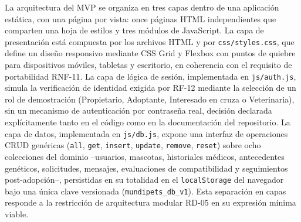 \documentclass[journal,onecolumn]{IEEEtran}
\begin{document}
	La arquitectura del MVP se organiza en tres capas dentro de una aplicación
	estática, con una página por vista: once páginas HTML independientes que
	comparten una hoja de estilos y tres módulos de JavaScript. La capa de
	presentación está compuesta por los archivos HTML y por
	\texttt{css/styles.css}, que define un diseño responsivo mediante CSS Grid
	y Flexbox con puntos de quiebre para dispositivos móviles, tabletas y
	escritorio, en coherencia con el requisito de portabilidad RNF-11. La capa
	de lógica de sesión, implementada en \texttt{js/auth.js}, simula la
	verificación de identidad exigida por RF-12 mediante la selección de un rol
	de demostración (Propietario, Adoptante, Interesado en cruza o
	Veterinaria), sin un mecanismo de autenticación por contraseña real,
	decisión declarada explícitamente tanto en el código como en la
	documentación del repositorio. La capa de datos, implementada en
	\texttt{js/db.js}, expone una interfaz de operaciones CRUD genéricas
	(\texttt{all}, \texttt{get}, \texttt{insert}, \texttt{update},
	\texttt{remove}, \texttt{reset}) sobre ocho colecciones del dominio
	--usuarios, mascotas, historiales médicos, antecedentes genéticos,
	solicitudes, mensajes, evaluaciones de compatibilidad y seguimientos
	post-adopción--, persistidas en su totalidad en el \texttt{localStorage}
	del navegador bajo una única clave versionada
	(\texttt{mundipets\_db\_v1}). Esta separación en capas responde a la
	restricción de arquitectura modular RD-05 en su expresión mínima viable.
	
\end{document}
